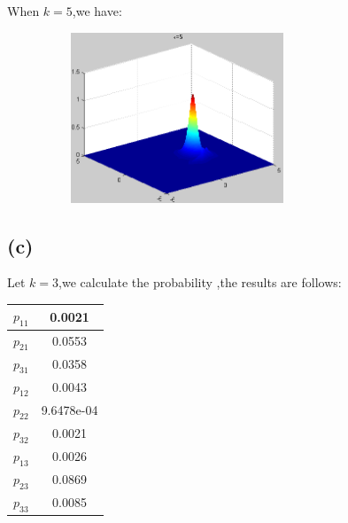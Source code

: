 \documentclass[10pt,a4paper]{article}
\begin{document}
When $k=5$,we have:

\includegraphics[height=2in,width=4in]{6.png}
\subsection{(c)}
Let $k=3$,we calculate the probability ,the results are follows:
\begin{center}
\begin{tabular}{|c|c|}
	\hline $p_{11}$  & 0.0021  \\ 
	\hline $p_{21}$ & 0.0553 \\ 
	\hline  $p_{31}$ & 0.0358  \\ 
	\hline $p_{12}$ & 0.0043  \\ 
	\hline $p_{22}$ & 9.6478e-04  \\ 
	\hline  $p_{32}$& 0.0021 \\ 
	\hline  $p_{13}$& 0.0026  \\ 
	\hline $p_{23}$ & 0.0869  \\ 
	\hline $p_{33}$  & 0.0085  \\ 
	\hline 
\end{tabular} 
\end{center}
\end{document}
